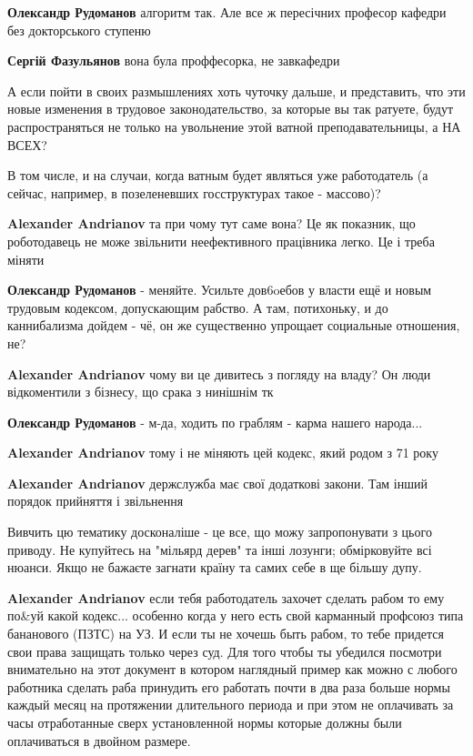 \begin{itemize}
\begin{itemize}
\textbf{Олександр Рудоманов} алгоритм так. Але все ж пересічних професор кафедри без докторського ступеню

\textbf{Сергій Фазульянов} вона була проффесорка, не завкафедри
\end{itemize} %


А если пойти в своих размышлениях хоть чуточку дальше, и представить, что эти
новые изменения в трудовое законодательство, за которые вы так ратуете, будут
распространяться не только на увольнение этой ватной преподавательницы, а НА
ВСЕХ?

В том числе, и на случаи, когда ватным будет являться уже работодатель (а
сейчас, например, в позеленевших госструктурах такое - массово)?

\begin{itemize} %
\textbf{Alexander Andrianov} та при чому тут саме вона? Це як показник, що роботодавець не може звільнити неефективного працівника легко. Це і треба міняти

\textbf{Олександр Рудоманов} - меняйте. Усильте дов6oебов у власти ещё и новым трудовым кодексом, допускающим рабство. А там, потихоньку, и до каннибализма дойдем - чё, он же существенно упрощает социальные отношения, не?

\textbf{Alexander Andrianov} чому ви це дивитесь з погляду на владу? Он люди відкоментили з бізнесу, що срака з нинішнім тк

\textbf{Олександр Рудоманов} - м-да, ходить по граблям - карма нашего народа...

\textbf{Alexander Andrianov} тому і не міняють цей кодекс, який родом з 71 року

\textbf{Alexander Andrianov} держслужба має свої додаткові закони. Там інший порядок прийняття і звільнення

Вивчить цю тематику досконаліше - це все, що можу запропонувати з цього приводу. Не купуйтесь на "мільярд дерев" та інші лозунги; обмірковуйте всі нюанси. Якщо не бажаєте загнати країну та самих себе в ще більшу дупу.

\textbf{Alexander Andrianov} если тебя работодатель захочет
сделать рабом то ему по\&уй какой кодекс... особенно когда у него есть свой
карманный профсоюз типа бананового (ПЗТС) на УЗ. И если ты не хочешь быть
рабом, то тебе придется свои права защищать только через суд. Для того чтобы ты
убедился посмотри внимательно на этот документ в котором наглядный пример как
можно с любого работника сделать раба принудить его работать почти в два раза
больше нормы каждый месяц на протяжении длительного периода и при этом не
оплачивать за часы отработанные сверх установленной нормы которые должны были
оплачиваться в двойном размере.


\end{itemize}
\end{itemize}
